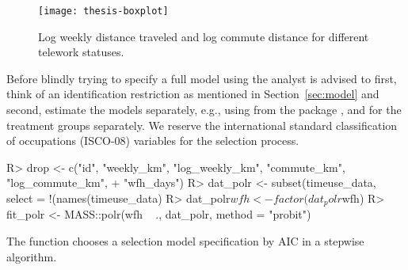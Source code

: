 \documentclass[%
    twoside, openright, titlepage, numbers=noenddot,%
    cleardoublepage=empty,%
    abstract=false,%
    BCOR=5.5mm, paper=a5, fontsize=10pt,%
]{scrreprt}
\begin{document}
\begin{figure}[t!]
\centering
\texttt{[image: thesis-boxplot]}
\caption{\label{fig:boxplot} Log weekly distance traveled and log commute distance for different telework statuses.}
\end{figure}

Before blindly trying to specify a full model using  the analyst is advised to first, think of an identification restriction as mentioned in Section~\ref{sec:model} and second, estimate the models separately, e.g., using  from the  package \citep{Venables+Ripley:2002}, and  for the treatment groups separately. We reserve the international standard classification of occupations (ISCO-08) variables for the selection process.
%
\begin{Schunk}
\begin{Sinput}
R> drop <- c("id", "weekly_km", "log_weekly_km", "commute_km", "log_commute_km",
+    "wfh_days")
R> dat_polr <- subset(timeuse_data, select = !(names(timeuse_data) %in% drop))
R> dat_polr$wfh <- factor(dat_polr$wfh)
R> fit_polr <- MASS::polr(wfh ~ ., dat_polr, method = "probit")
\end{Sinput}
\end{Schunk}
%
The  function chooses a selection model specification by AIC in a stepwise algorithm.
%
\end{document}

